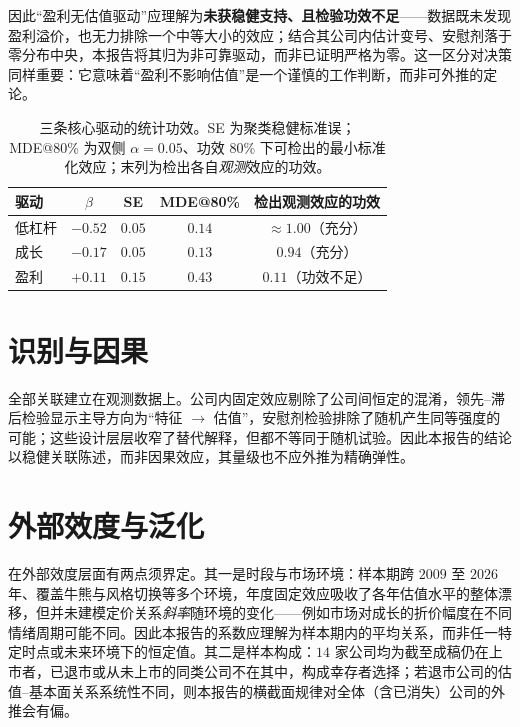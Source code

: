 \documentclass[UTF8, a4paper, fontset=none, zihao=-4]{ctexrep}
\begin{document}
因此“盈利无估值驱动”应理解为\textbf{未获稳健支持、且检验功效不足}——数据既未发现盈利溢价，也无力排除一个中等大小的效应；结合其公司内估计变号、安慰剂落于零分布中央，本报告将其归为非可靠驱动，而非已证明严格为零。这一区分对决策同样重要：它意味着“盈利不影响估值”是一个谨慎的工作判断，而非可外推的定论。

\begin{table}[htbp]
\caption{三条核心驱动的统计功效。SE 为聚类稳健标准误；MDE@80\% 为双侧 $\alpha=0.05$、功效 $80\%$ 下可检出的最小标准化效应；末列为检出各自\emph{观测}效应的功效。}
\label{tab:power}
\footnotesize
\renewcommand{\arraystretch}{1.35}
\begin{tabular*}{\textwidth}{@{\extracolsep{\fill}}lcccc@{}}
\toprule
\textbf{\color{brandblue}驱动} & \textbf{\color{brandblue}$\beta$} & \textbf{\color{brandblue}SE} & \textbf{\color{brandblue}MDE@80\%} & \textbf{\color{brandblue}检出观测效应的功效} \\
\midrule
低杠杆 & $-0.52$ & $0.05$ & $0.14$ & $\approx 1.00$（充分） \\
成长 & $-0.17$ & $0.05$ & $0.13$ & $0.94$（充分） \\
盈利 & $+0.11$ & $0.15$ & $0.43$ & $0.11$（功效不足） \\
\bottomrule
\end{tabular*}
\end{table}

\section{识别与因果}
全部关联建立在观测数据上。公司内固定效应剔除了公司间恒定的混淆，领先--滞后检验显示主导方向为“特征 $\to$ 估值”，安慰剂检验排除了随机产生同等强度的可能；这些设计层层收窄了替代解释，但都不等同于随机试验。因此本报告的结论以稳健关联陈述，而非因果效应，其量级也不应外推为精确弹性。

\section{外部效度与泛化}
在外部效度层面有两点须界定。其一是时段与市场环境：样本期跨 $2009$ 至 $2026$ 年、覆盖牛熊与风格切换等多个环境，年度固定效应吸收了各年估值水平的整体漂移，但并未建模定价关系\emph{斜率}随环境的变化——例如市场对成长的折价幅度在不同情绪周期可能不同。因此本报告的系数应理解为样本期内的平均关系，而非任一特定时点或未来环境下的恒定值。其二是样本构成：$14$ 家公司均为截至成稿仍在上市者，已退市或从未上市的同类公司不在其中，构成幸存者选择；若退市公司的估值--基本面关系系统性不同，则本报告的横截面规律对全体（含已消失）公司的外推会有偏。
\end{document}
